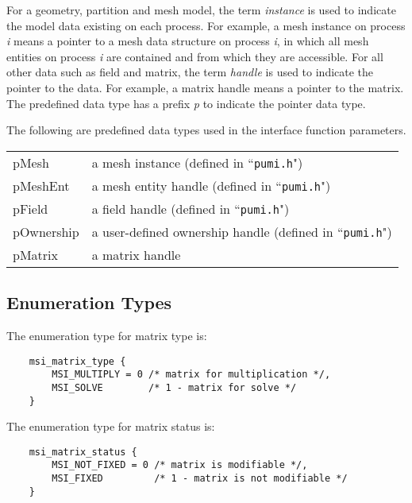 For a geometry, partition and mesh model, the term \emph{instance} is used to indicate the model data existing on each process. For example, a mesh instance on process \emph{i} means a pointer to a mesh data structure on process \emph{i}, in which all mesh entities on process \emph{i} are contained and from which they are accessible. For all other data such as field and matrix, the term \emph{handle} is used to indicate the pointer to the data. For example, a matrix handle means a pointer to the matrix. The predefined data type has a prefix \emph{p} to indicate the pointer data type.

The following are predefined data types used in the interface function parameters.

\begin{tabular}{lp{14cm}}	
	pMesh  & 	a mesh instance (defined in ``\texttt{pumi.h}")\\
        pMeshEnt & 	a mesh entity handle (defined in ``\texttt{pumi.h}")\\
        pField & 	a field handle (defined in ``\texttt{pumi.h}")\\
	pOwnership & 	a user-defined ownership handle (defined in ``\texttt{pumi.h}") \\
 	pMatrix &	a matrix handle \\
\end{tabular}	

\subsection{Enumeration Types}

The enumeration type for matrix type is:

\begin{verbatim}
    msi_matrix_type {
        MSI_MULTIPLY = 0 /* matrix for multiplication */,
        MSI_SOLVE      	 /* 1 - matrix for solve */
    }
\end{verbatim}\vspace{-1cm}\hspace{1cm}

The enumeration type for matrix status is:

\begin{verbatim}
    msi_matrix_status {
        MSI_NOT_FIXED = 0 /* matrix is modifiable */,
        MSI_FIXED         /* 1 - matrix is not modifiable */
    }
\end{verbatim}\vspace{-1cm}\hspace{1cm}

